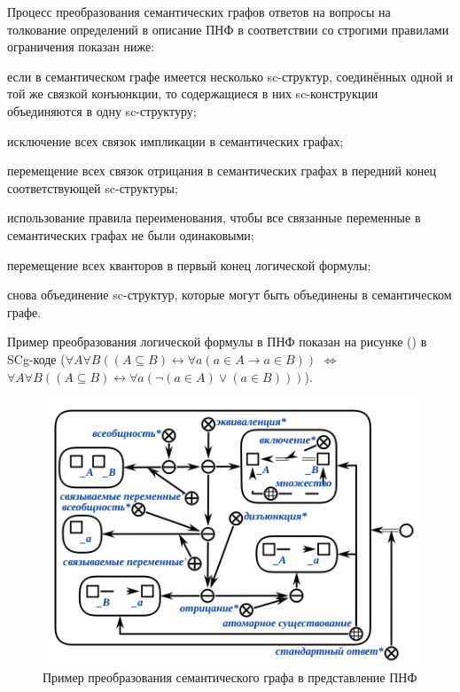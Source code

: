 Процесс преобразования семантических графов ответов на вопросы на толкование определений в описание ПНФ в соответствии со строгими правилами ограничения показан ниже:

\begin{textitemize}
	\item если в семантическом графе имеется несколько sc-структур, соединённых одной и той же связкой конъюнкции, то содержащиеся в них sc-конструкции объединяются в одну sc-структуру;
	
	\item исключение всех связок импликации в семантических графах;
	
	\item перемещение всех связок отрицания в семантических графах в передний конец соответствующей sc-структуры;
	
	\item использование правила переименования, чтобы все связанные переменные в семантических графах не были одинаковыми;
	
	\item перемещение всех кванторов в первый конец логической формулы;
	
	\item снова объединение sc-структур, которые могут быть объединены в семантическом графе.
	
\end{textitemize}

Пример преобразования логической формулы в ПНФ показан на рисунке (\textit{}) в SCg-коде ($\forall A\forall B((A\subseteq B) \leftrightarrow \forall a(a\in A\rightarrow a\in B))$ $\Leftrightarrow$ $\forall A\forall B((A\subseteq B) \leftrightarrow \forall a ( \neg ( a\in A ) \lor (a\in B)))$).

\begin{figure}[H]
	\includegraphics[scale=0.8]{author/part7/figures/PNF_example.png}
	\caption{Пример преобразования семантического графа в представление ПНФ}
	\label{fig:PNF_example}
\end{figure}

